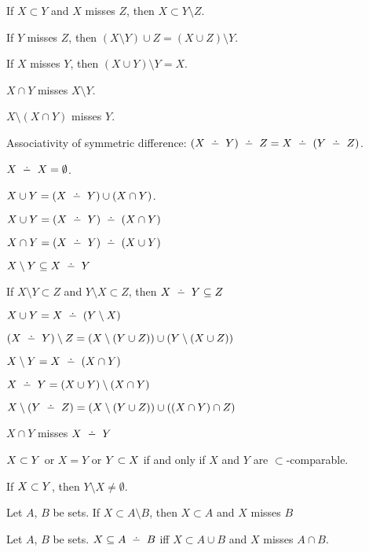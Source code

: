 \begin{thm}
\item\label{xboole1:86} If $X\subset Y$ and $X$ misses $Z$, then
  $X\subset Y\setminus Z$.
\item\label{xboole1:87} If $Y$ misses $Z$, then $(X\setminus Y)\cup Z=(X\cup Z)\setminus Y$.
\item\label{xboole1:88} If $X$ misses $Y$, then $(X\cup Y)\setminus Y=X$.
\item\label{xboole1:89} $X\cap Y$ misses $X\setminus Y$.
\item\label{xboole1:90} $X\setminus(X\cap Y)$ misses $Y$.
\item\label{xboole1:91} Associativity of symmetric difference:
  $(X\symdiff Y)\symdiff Z=X\symdiff(Y\symdiff Z)$.
\item\label{xboole1:92} $X\symdiff X=\emptyset$.
\item\label{xboole1:93} $X\cup Y=(X\symdiff Y)\cup(X\cap Y)$.
\item\label{xboole1:94} $X \cup Y = (X \symdiff Y) \symdiff (X \cap Y)$
\item\label{xboole1:95} $X \cap Y = (X \symdiff Y) \symdiff (X \cup Y)$
\item\label{xboole1:96} $X \setminus Y \subset X \symdiff Y$
\item\label{xboole1:97} If $X \setminus Y \subset Z$ and $Y \setminus X \subset Z$, then $X \symdiff Y \subset Z$
\item\label{xboole1:98} $X \cup Y = X \symdiff (Y \setminus X)$
\item\label{xboole1:99} $(X \symdiff Y) \setminus Z = (X \setminus (Y \cup Z)) \cup (Y \setminus (X \cup Z))$
\item\label{xboole1:100} $X \setminus Y = X \symdiff (X \cap Y)$
\item\label{xboole1:101} $X \symdiff Y = (X \cup Y) \setminus (X \cap Y)$
\item\label{xboole1:102} $X \setminus (Y \symdiff Z) = (X \setminus (Y \cup Z)) \cup ((X \cap Y) \cap Z)$
\item\label{xboole1:103} $X \cap Y$ misses $X \symdiff Y$
\item\label{xboole1:104} $X \properSubset  Y$ or $X = Y$ or $Y \properSubset  X$ if and only if
  $X$ and $Y$ are $\subset$-comparable.
\item\label{xboole1:105} If $X \properSubset  Y$, then $Y \setminus X \neq \emptyset$.
\item\label{xboole1:106} Let $A$, $B$ be sets. If $X \subset A \setminus B$, then $X \subset A$ and $X$ misses $B$
\item\label{xboole1:107} Let $A$, $B$ be sets. $X \subset A \symdiff B$ iff $X \subset A \cup B$ and $X$ misses $A \cap B$.

\end{thm}
